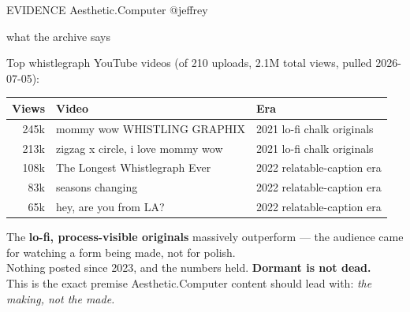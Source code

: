 \documentclass[12pt]{article}
\makeatletter
\newcommand{\rb}{{\color{acred}\textbullet}\hspace{0.6em}}
\newcommand{\ac}{Aesthetic\textcolor{acpink}{.}Computer}
\newenvironment{slide}[2]{%
  \clearpage
  {\footnotesize\color{acgray}\MakeUppercase{#1}\hfill}%
  {\footnotesize\color{acgray}\ac{} \textperiodcentered{} @jeffrey}\par
  \vspace{0.1em}
  {\acbold\fontsize{31pt}{35pt}\selectfont\color{acdark}#2\par}
  \vspace{0.9em}
  \large
}{%
  \vfill
  {\hfill\footnotesize\color{acgray}\thepage}%
}
\makeatother
\begin{document}
\begin{slide}{evidence}{what the archive says}
Top whistlegraph YouTube videos (of 210 uploads, 2.1M total views, pulled 2026-07-05):

\vspace{0.8em}
\begin{center}
\begin{tabular}{@{}rll@{}}
\toprule
\textbf{Views} & \textbf{Video} & \textbf{Era} \\
\midrule
245k & mommy wow WHISTLING GRAPHIX & 2021 lo-fi chalk originals \\
213k & zigzag x circle, i love mommy wow & 2021 lo-fi chalk originals \\
108k & The Longest Whistlegraph Ever & 2022 relatable-caption era \\
83k  & seasons changing & 2022 relatable-caption era \\
65k  & hey, are you from LA? & 2022 relatable-caption era \\
\bottomrule
\end{tabular}
\end{center}

\vspace{1em}
\rb The \textbf{lo-fi, process-visible originals} massively outperform --- the audience came for watching a form being made, not for polish.\\
\rb Nothing posted since 2023, and the numbers held. \textbf{Dormant is not dead.}\\
\rb This is the exact premise \ac{} content should lead with: \textit{the making, not the made.}
\end{slide}
\end{document}
